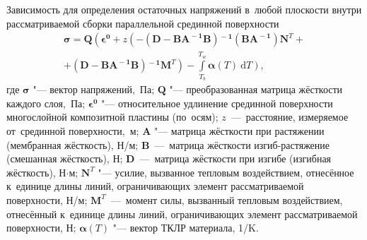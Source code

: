 Зависимость для определения
остаточных напряжений в~любой плоскости внутри рассматриваемой сборки
параллельной срединной поверхности
\begin{multline*}
    \boldsymbol{\sigma}
    =
    \mathbf{Q}
    \left(
        \boldsymbol{\epsilon^0}
        +
        z
        \left(
            -
            (\mathbf{D} - \mathbf{B A^{\!\!-1}B})\mathbf{{}^{\!-1}} %
            (\mathbf{B A^{\!\!-1}}) %
            \mathbf{N}^T
            \right.\right. %
            + \\ +
            \left. %
            (\mathbf{D} - \mathbf{B A^{\!\!-1}B})\mathbf{{}^{\!-1}} %
            \mathbf{M}^T
        \right)
        -
        \int\limits_{T_{b}}^{T_{w}}
        \left. %
        \boldsymbol{\alpha}(T)\:\mathrm{d}T
    \right),
\end{multline*}
\noindent где
$\boldsymbol{\sigma}$ "--- вектор напряжений,~Па; %
$\mathbf{Q}$ "--- преобразованная матрица жёсткости каждого слоя,~Па;
$\boldsymbol{\epsilon^0}$ "--- относительное удлинение срединной поверхности многослойной композитной пластины (по~осям); %
$z$~---~расстояние, измеряемое от~срединной поверхности,~м;
 $ \mathbf{A} $ "--- матрица жёсткости при растяжении (мембранная жёсткость), Н/м;
$ \mathbf{B} $~---~матрица жёсткости изгиб\nb-растяжение (смешанная жёсткость), Н;
$ \mathbf{D} $~---~матрица жёсткости при изгибе (изгибная жёсткость), Н$\cdot$м;
$ \mathbf{N}^T $ "--- усилие, вызванное тепловым воздействием, отнесённое к~единице длины линий, ограничивающих элемент рассматриваемой поверхности, Н/м;
$ \mathbf{M}^T $~---~момент силы, вызванный тепловым воздействием, отнесённый к~единице длины линий, ограничивающих элемент рассматриваемой поверхности, Н;
\(\boldsymbol{\alpha}(T)\) "--- вектор ТКЛР материала, 1/K.


